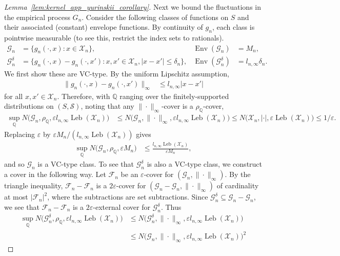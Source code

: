 \documentclass[11pt,lof]{puthesis}
\newcommand{\Q}{\ensuremath{\mathbb{Q}}}
\newcommand{\cF}{\ensuremath{\mathcal{F}}}
\newcommand{\cX}{\ensuremath{\mathcal{X}}}
\newcommand{\cG}{\ensuremath{\mathcal{G}}}
\newcommand{\cS}{\ensuremath{\mathcal{S}}}
\DeclareMathOperator{\Env}{Env}
\DeclareMathOperator{\Leb}{Leb}
\theoremstyle{break}
\theoremstyle{proof}
\newtheorem{proof}{Proof}
\begin{document}
\begin{proof}[Lemma~\ref{lem:kernel_app_yurinskii_corollary}]
Next we bound the fluctuations in
the empirical process $G_n$.
Consider the following classes of functions on $S$
and their associated (constant) envelope functions.
By continuity of $g_n$,
each class is pointwise measurable
(to see this, restrict the index sets to rationals).
%
\begin{align*}
\cG_n
&=
\big\{
g_n(\cdot, x):
x \in \cX_n
\big\},
&\Env(\cG_n)
&=
M_n, \\
\cG_n^\delta
&=
\big\{
g_n(\cdot, x)
- g_n(\cdot, x'):
x, x' \in \cX_n,
|x-x'| \leq \delta_n
\big\},
&\Env(\cG_n^\delta)
&=
l_{n,\infty} \delta_n.
\end{align*}
%
We first show these are VC-type.
By the uniform Lipschitz assumption,
%
\begin{align*}
\big\|
g_n(\cdot, x)
- g_n(\cdot, x')
\big\|_\infty
&\leq l_{n,\infty} |x-x'|
\end{align*}
%
for all $x,x' \in \cX_n$.
Therefore, with $\Q$ ranging over the
finitely-supported distributions
on $(S, \cS)$,
noting that any $\|\cdot\|_\infty$-cover
is a $\rho_\Q$-cover,
%
\begin{align*}
\sup_\Q
N\big(\cG_n, \rho_\Q, \varepsilon l_{n,\infty} \!\Leb(\cX_n)\big)
&\leq
N\big(\cG_n, \|\cdot\|_\infty,
\varepsilon l_{n,\infty} \!\Leb(\cX_n)\big)
\leq
N\big(\cX_n, |\cdot|, \varepsilon \!\Leb(\cX_n)\big)
\leq
1/\varepsilon.
\end{align*}
%
Replacing $\varepsilon$ by
$\varepsilon M_n/(l_{n,\infty} \Leb(\cX_n))$
gives
%
\begin{align*}
\sup_\Q
N\big(\cG_n, \rho_\Q, \varepsilon M_n \big)
&\leq
\frac{l_{n,\infty} \Leb(\cX_n)}{\varepsilon M_n},
\end{align*}
%
and so $\cG_n$
is a VC-type class.
To see that $\cG_n^\delta$
is also a VC-type class,
we construct a cover in the following way.
Let $\cF_n$ be an $\varepsilon$-cover
for $(\cG_n, \|\cdot\|_\infty)$.
By the triangle inequality,
$\cF_n - \cF_n$ is a $2\varepsilon$-cover
for $(\cG_n - \cG_n, \|\cdot\|_\infty)$
of cardinality at most $|\cF_n|^2$,
where the subtractions are set subtractions.
Since $\cG_n^\delta \subseteq \cG_n - \cG_n$,
we see that $\cF_n - \cF_n$ is a $2\varepsilon$-external cover
for $\cG_n^\delta$. Thus
%
\begin{align*}
\sup_\Q
N\big(\cG_n^\delta, \rho_\Q, \varepsilon l_{n,\infty} \Leb(\cX_n)\big)
&\leq
N\big(\cG_n^\delta, \|\cdot\|_\infty,
\varepsilon l_{n,\infty} \Leb(\cX_n)\big) \\
&\leq
N\big(\cG_n, \|\cdot\|_\infty,
\varepsilon l_{n,\infty} \Leb(\cX_n)\big)^2

\end{align*}
\end{proof}
\end{document}
